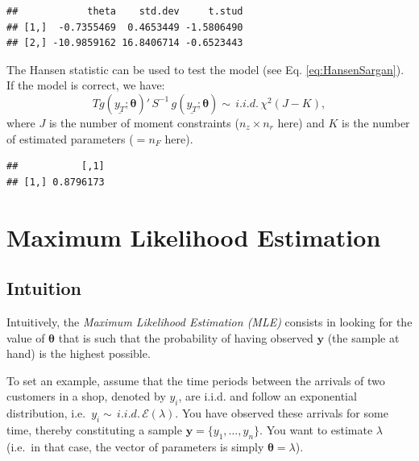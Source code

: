 \documentclass[
  12pt,
]{book}
\newenvironment{Shaded}{\begin{snugshade}}{\end{snugshade}}
\newcommand{\AttributeTok}[1]{\textcolor[rgb]{0.77,0.63,0.00}{#1}}
\newcommand{\FunctionTok}[1]{\textcolor[rgb]{0.00,0.00,0.00}{#1}}
\newcommand{\NormalTok}[1]{#1}
\newcommand{\OtherTok}[1]{\textcolor[rgb]{0.56,0.35,0.01}{#1}}
\newcommand{\SpecialCharTok}[1]{\textcolor[rgb]{0.00,0.00,0.00}{#1}}
\theoremstyle{definition}
\theoremstyle{definition}
\theoremstyle{definition}
\theoremstyle{definition}
\theoremstyle{remark}
\begin{document}
\begin{verbatim}
##            theta    std.dev     t.stud
## [1,]  -0.7355469  0.4653449 -1.5806490
## [2,] -10.9859162 16.8406714 -0.6523443
\end{verbatim}

The Hansen statistic can be used to test the model (see Eq. \eqref{eq:HansenSargan}). If the model is correct, we have:
\[
T g(\underline{y_T};{\boldsymbol\theta})'\, S^{-1} \, g(\underline{y_T};{\boldsymbol\theta}) \sim \,i.i.d.\,\chi^2(J - K),
\]
where \(J\) is the number of moment constraints (\(n_z \times n_r\) here) and \(K\) is the number of estimated parameters (\(=n_F\) here).

\begin{Shaded}
\end{Shaded}

\begin{verbatim}
##           [,1]
## [1,] 0.8796173
\end{verbatim}

\hypertarget{secMLE}{%
\section{Maximum Likelihood Estimation}\label{secMLE}}

\hypertarget{intuition}{%
\subsection{Intuition}\label{intuition}}

Intuitively, the \emph{Maximum Likelihood Estimation (MLE)} consists in looking for the value of \({\boldsymbol\theta}\) that is such that the probability of having observed \(\mathbf{y}\) (the sample at hand) is the highest possible.

To set an example, assume that the time periods between the arrivals of two customers in a shop, denoted by \(y_i\), are i.i.d. and follow an exponential distribution, i.e.~\(y_i \sim \,i.i.d.\, \mathcal{E}(\lambda)\). You have observed these arrivals for some time, thereby constituting a sample \(\mathbf{y}=\{y_1,\dots,y_n\}\). You want to estimate \(\lambda\) (i.e.~in that case, the vector of parameters is simply \({\boldsymbol\theta} = \lambda\)).
\end{document}
